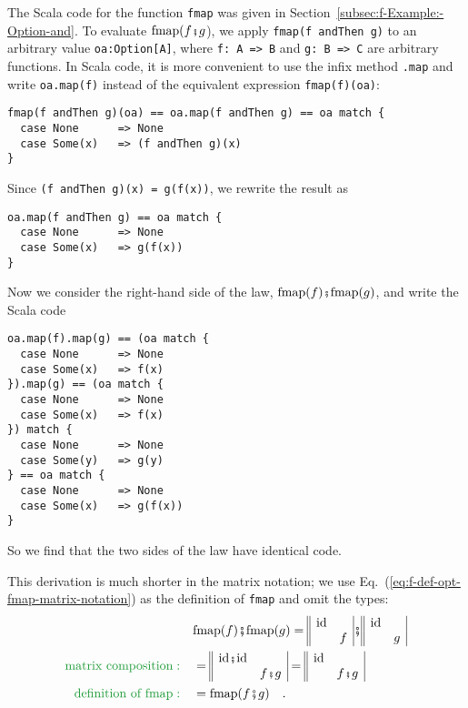 The Scala code for the function \lstinline!fmap! was given in Section~\ref{subsec:f-Example:-Option-and}.
To evaluate $\text{fmap}(f\bef g$), we apply \lstinline!fmap(f andThen g)!
to an arbitrary value \lstinline!oa:Option[A]!, where \lstinline!f: A => B!
and \lstinline!g: B => C! are arbitrary functions. In Scala code,
it is more convenient to use the infix method \lstinline!.map! and
write \lstinline!oa.map(f)! instead of the equivalent expression
\lstinline!fmap(f)(oa)!:
\begin{lstlisting}
fmap(f andThen g)(oa) == oa.map(f andThen g) == oa match {
  case None      => None
  case Some(x)   => (f andThen g)(x)
}
\end{lstlisting}
Since \lstinline!(f andThen g)(x) = g(f(x))!, we rewrite the result
as
\begin{lstlisting}
oa.map(f andThen g) == oa match {
  case None      => None
  case Some(x)   => g(f(x))
}
\end{lstlisting}
Now we consider the right-hand side of the law, $\text{fmap}(f)\bef\text{fmap}(g)$,
and write the Scala code
\begin{lstlisting}
oa.map(f).map(g) == (oa match {
  case None      => None
  case Some(x)   => f(x)
}).map(g) == (oa match {
  case None      => None
  case Some(x)   => f(x)
}) match {
  case None      => None
  case Some(y)   => g(y)
} == oa match {
  case None      => None
  case Some(x)   => g(f(x))
}
\end{lstlisting}
So we find that the two sides of the law have identical code.

This derivation is much shorter in the matrix notation; we use Eq.~(\ref{eq:f-def-opt-fmap-matrix-notation})
as the definition of \lstinline!fmap! and omit the types:
\begin{align*}
 & \text{fmap}(f)\bef\text{fmap}(g)=\begin{array}{||cc|}
\text{id} & \\
 & f
\end{array}\bef\begin{array}{||cc|}
\text{id} & \\
 & g
\end{array}\\
{\color{greenunder}\text{matrix composition}:}\quad & =\begin{array}{||cc|}
\text{id}\bef\text{id} & \\
 & f\bef g
\end{array}=\begin{array}{||cc|}
\text{id} & \\
 & f\bef g
\end{array}\\
{\color{greenunder}\text{definition of fmap}:}\quad & =\text{fmap}(f\bef g)\quad.
\end{align*}

